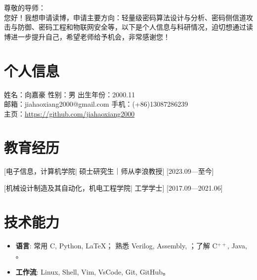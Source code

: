 \documentclass{resume}
\begin{document}
{
  \Large %
  \noindent
  尊敬的导师：\\

  您好！我想申请读博，申请主要方向：轻量级密码算法设计与分析、密码侧信道攻击与防御、密码工程和物联网安全等，以下是个人信息与科研情况，迫切想通过读博进一步提升自己，希望老师给予机会，非常感谢您！
  \vspace{1em}
  \normalsize %
}

\section{个人信息}
{
  \noindent
  姓名：向嘉豪 \quad 性别：男 \quad 出生年份：2000.11 \\
  邮箱：jiahaoxiang2000@gmail.com \quad 手机：(+86)13087286239 \\
  主页：\url{https://github.com/jiahaoxiang2000}
}



\section[教育经历]{教育经历}
[\textnormal{电子信息，计算机学院|}  硕士研究生｜师从李浪教授]
[2023.09—至今]

[\textnormal{机械设计制造及其自动化，机电工程学院|} 工学学士]
[2017.09—2021.06]

\section[技术能力]{技术能力\protect}
\begin{itemize}
  \item \textbf{语言}: 常用 C, Python, \LaTeX； 熟悉 Verilog, Assembly, ；了解 C$^{++}$, Java, 。
  \item \textbf{工作流}: Linux, Shell, Vim, VsCode,  Git, GitHub。
\end{itemize}
\end{document}
